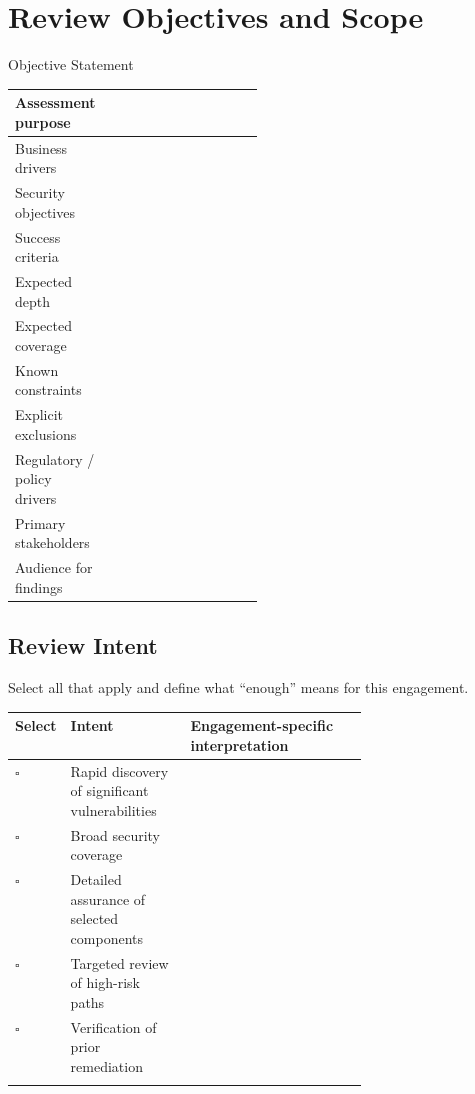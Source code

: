 \documentclass[10pt]{article}
\newcommand{\checkbox}{\ensuremath{\square}}
\begin{document}
\section{Review Objectives and Scope}
\begin{worksheetbox}{Objective Statement}
\par\smallskip\noindent\begin{tabularx}{\linewidth}{@{}L{0.29\linewidth}Y@{}}
Assessment purpose & \\ \midrule
Business drivers & \\ \midrule
Security objectives & \\ \midrule
Success criteria & \\ \midrule
Expected depth & \\ \midrule
Expected coverage & \\ \midrule
Known constraints & \\ \midrule
Explicit exclusions & \\ \midrule
Regulatory / policy drivers & \\ \midrule
Primary stakeholders & \\ \midrule
Audience for findings & \\ 
\end{tabularx}
\end{worksheetbox}

\subsection{Review Intent}
Select all that apply and define what ``enough'' means for this engagement.
\par\smallskip\noindent\begin{tabularx}{\linewidth}{@{}C{0.07\linewidth}L{0.34\linewidth}Y@{}}
\toprule
Select & Intent & Engagement-specific interpretation \\
\midrule
\checkbox & Rapid discovery of significant vulnerabilities & \\ \addlinespace[1.2em]
\checkbox & Broad security coverage & \\ \addlinespace[1.2em]
\checkbox & Detailed assurance of selected components & \\ \addlinespace[1.2em]
\checkbox & Targeted review of high-risk paths & \\ \addlinespace[1.2em]
\checkbox & Verification of prior remediation & \\ \addlinespace[1.2em]
\bottomrule
\end{tabularx}
\clearpage
\end{document}
